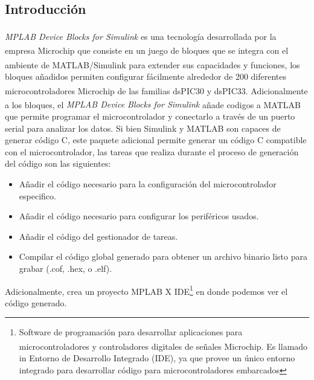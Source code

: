 \subsection{Introducci\'{o}n}

\textit{MPLAB\textsuperscript{\textregistered} Device Blocks for Simulink\textsuperscript{\textregistered}} es una tecnolog\'{i}a desarrollada por la empresa Microchip\textsuperscript{\textregistered} que consiste en un juego de bloques que se integra con el ambiente de MATLAB\textsuperscript{\textregistered}/Simulink\textsuperscript{\textregistered} para extender sus capacidades y funciones, los bloques a\~{n}adidos permiten configurar f\'{a}cilmente alrededor de 200 diferentes microcontroladores Microchip \textsuperscript{\textregistered} de las familias dsPIC\textsuperscript{\textregistered}30 y dsPIC\textsuperscript{\textregistered}33. Adicionalmente a los bloques, el \textit{MPLAB\textsuperscript{\textregistered} Device Blocks for Simulink\textsuperscript{\textregistered}} a\~{n}ade codigos a MATLAB que permite programar el microcontrolador y conectarlo a trav\'{e}s  de un puerto serial para analizar los datos. Si bien Simulink y MATLAB son capaces de generar c\'{o}digo C, este paquete adicional permite generar un c\'{o}digo C compatible con el microcontrolador, las tareas que realiza durante el proceso de generaci\'{o}n del c\'{o}digo son las siguientes:    

\begin{itemize}
    \item A\~{n}adir el c\'{o}digo necesario para la configuraci\'{o}n del microcontrolador especifico.
    \item A\~{n}adir el c\'{o}digo necesario para configurar los perif\'{e}ricos usados.
    \item A\~{n}adir el c\'{o}digo del gestionador de tareas.
    \item Compilar el c\'{o}digo global generado para obtener un archivo binario listo para grabar (.cof,
.hex, o .elf).
\end{itemize}

Adicionalmente, crea un proyecto MPLAB X IDE\footnote{Software de programaci\'{o}n para desarrollar aplicaciones para microcontroladores y controladores digitales de se\~{n}ales Microchip\textsuperscript{\textregistered}. Es llamado in Entorno de Desarrollo Integrado (IDE), ya que provee un \'{u}nico entorno integrado para desarrollar c\'{o}digo para microcontroladores embarcados} en donde podemos ver el c\'{o}digo generado.


